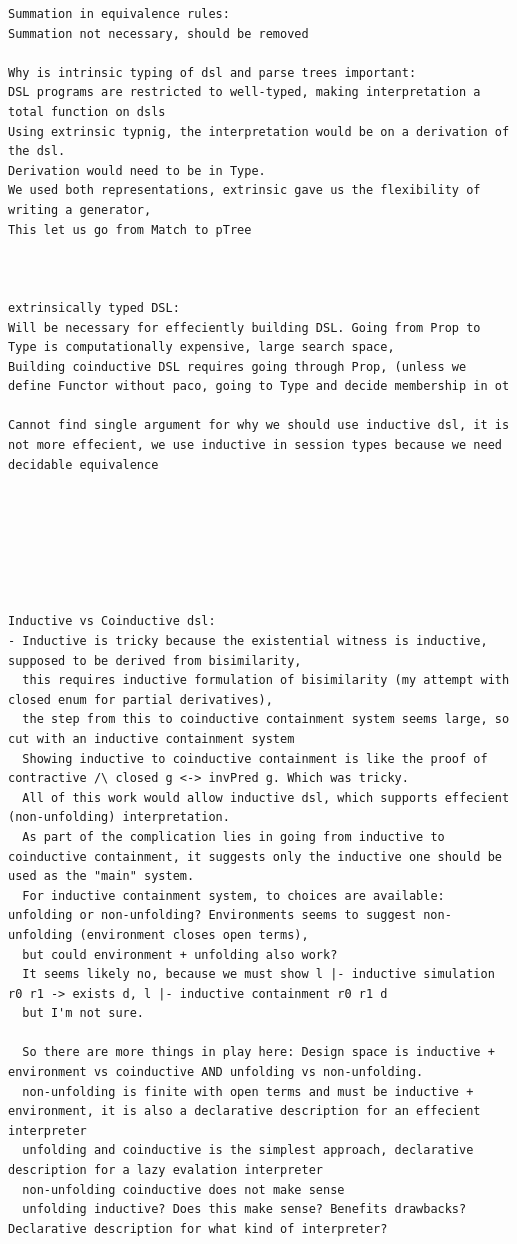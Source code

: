 \begin{verbatim}
Summation in equivalence rules:
Summation not necessary, should be removed

Why is intrinsic typing of dsl and parse trees important:
DSL programs are restricted to well-typed, making interpretation a total function on dsls
Using extrinsic typnig, the interpretation would be on a derivation of the dsl.
Derivation would need to be in Type.
We used both representations, extrinsic gave us the flexibility of writing a generator,
This let us go from Match to pTree



extrinsically typed DSL:
Will be necessary for effeciently building DSL. Going from Prop to Type is computationally expensive, large search space,
Building coinductive DSL requires going through Prop, (unless we define Functor without paco, going to Type and decide membership in ot

Cannot find single argument for why we should use inductive dsl, it is not more effecient, we use inductive in session types because we need decidable equivalence







Inductive vs Coinductive dsl:
- Inductive is tricky because the existential witness is inductive, supposed to be derived from bisimilarity,
  this requires inductive formulation of bisimilarity (my attempt with closed enum for partial derivatives),
  the step from this to coinductive containment system seems large, so cut with an inductive containment system
  Showing inductive to coinductive containment is like the proof of contractive /\ closed g <-> invPred g. Which was tricky.
  All of this work would allow inductive dsl, which supports effecient (non-unfolding) interpretation.
  As part of the complication lies in going from inductive to coinductive containment, it suggests only the inductive one should be used as the "main" system.
  For inductive containment system, to choices are available: unfolding or non-unfolding? Environments seems to suggest non-unfolding (environment closes open terms),
  but could environment + unfolding also work? 
  It seems likely no, because we must show l |- inductive simulation r0 r1 -> exists d, l |- inductive containment r0 r1 d
  but I'm not sure.

  So there are more things in play here: Design space is inductive + environment vs coinductive AND unfolding vs non-unfolding.
  non-unfolding is finite with open terms and must be inductive + environment, it is also a declarative description for an effecient interpreter 
  unfolding and coinductive is the simplest approach, declarative description for a lazy evalation interpreter
  non-unfolding coinductive does not make sense
  unfolding inductive? Does this make sense? Benefits drawbacks? Declarative description for what kind of interpreter?



\end{verbatim}
